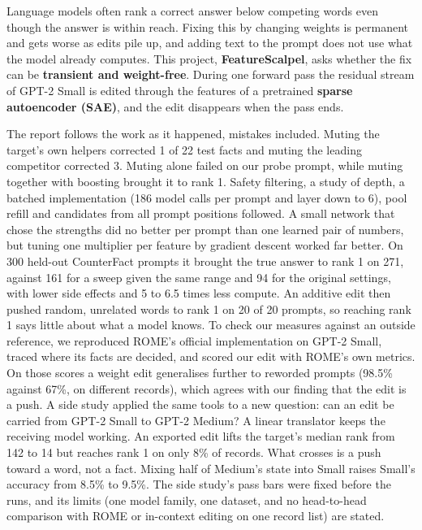 Language models often rank a correct answer below competing words even though the answer is within reach. Fixing this by changing weights is permanent and gets worse as edits pile up, and adding text to the prompt does not use what the model already computes. This project, \textbf{FeatureScalpel}, asks whether the fix can be \textbf{transient and weight-free}. During one forward pass the residual stream of GPT-2 Small is edited through the features of a pretrained \textbf{sparse autoencoder (SAE)}, and the edit disappears when the pass ends.

The report follows the work as it happened, mistakes included. Muting the target's own helpers corrected 1 of 22 test facts and muting the leading competitor corrected 3. Muting alone failed on our probe prompt, while muting together with boosting brought it to rank 1. Safety filtering, a study of depth, a batched implementation (186 model calls per prompt and layer down to 6), pool refill and candidates from all prompt positions followed. A small network that chose the strengths did no better per prompt than one learned pair of numbers, but tuning one multiplier per feature by gradient descent worked far better. On 300 held-out CounterFact prompts it brought the true answer to rank 1 on 271, against 161 for a sweep given the same range and 94 for the original settings, with lower side effects and 5 to 6.5 times less compute. An additive edit then pushed random, unrelated words to rank 1 on 20 of 20 prompts, so reaching rank 1 says little about what a model knows. To check our measures against an outside reference, we reproduced ROME's official implementation on GPT-2 Small, traced where its facts are decided, and scored our edit with ROME's own metrics. On those scores a weight edit generalises further to reworded prompts (98.5\% against 67\%, on different records), which agrees with our finding that the edit is a push. A side study applied the same tools to a new question: can an edit be carried from GPT-2 Small to GPT-2 Medium? A linear translator keeps the receiving model working. An exported edit lifts the target's median rank from 142 to 14 but reaches rank 1 on only 8\% of records. What crosses is a push toward a word, not a fact. Mixing half of Medium's state into Small raises Small's accuracy from 8.5\% to 9.5\%. The side study's pass bars were fixed before the runs, and its limits (one model family, one dataset, and no head-to-head comparison with ROME or in-context editing on one record list) are stated.
